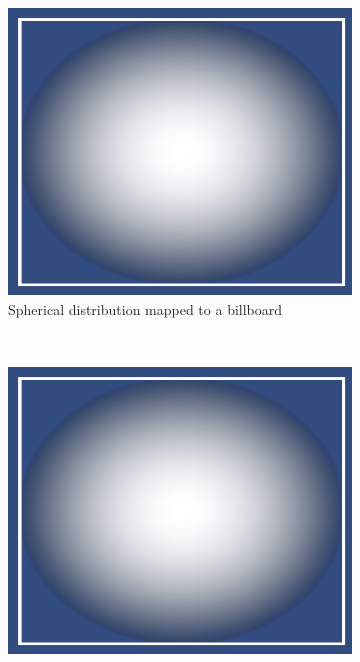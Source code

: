 \begin{figure}[t]
\centering
	\begin{subfigure}[t]{0.4\textwidth}
	\includegraphics[width=\textwidth]{../res/spherebillboard.png}
	\caption{Spherical distribution mapped to a billboard}
	\end{subfigure}
	~
	\begin{subfigure}[t]{0.4\textwidth}
	\includegraphics[width=\textwidth]{../res/spherebillboard.png}

\end{subfigure}
\end{figure}
